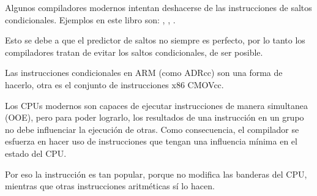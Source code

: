 ﻿

\label{branch_predictors}

Algunos compiladores modernos intentan deshacerse de las instrucciones de saltos condicionales.
Ejemplos en este libro son: , , .

Esto se debe a que el predictor de saltos no siempre es perfecto, por lo tanto los compiladores
tratan de evitar los saltos condicionales, de ser posible.

Las instrucciones condicionales en ARM (como ADRcc) son una forma de hacerlo, otra es el conjunto de instrucciones x86 CMOVcc.


Los CPUs modernos son capaces de ejecutar instrucciones de manera simultanea (\ac{OOE}), pero para
poder lograrlo, los resultados de una instrucci\'on en un grupo no debe influenciar la ejecuci\'on de otras.
Como consecuencia, el compilador se esfuerza en hacer uso de instrucciones que tengan una influencia m\'inima en el estado del CPU.

Por eso la instrucci\'on \LEA es tan popular, porque no modifica las banderas del CPU, mientras que otras instrucciones aritm\'eticas s\'i lo hacen.
